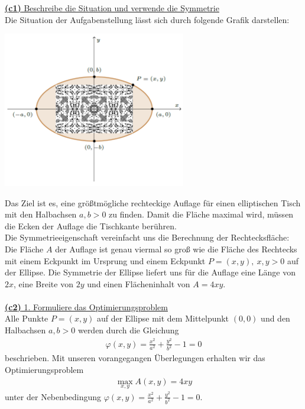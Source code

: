 \underline{\textbf{(c1)} Beschreibe die Situation und verwende die Symmetrie}\\
Die Situation der Aufgabenstellung lässt sich durch folgende Grafik darstellen:
\begin{center}
	\includegraphics[width=0.6\textwidth]{pictures/aufgabe1_c}
\end{center}
Das Ziel ist es, eine größtmögliche rechteckige Auflage für einen elliptischen Tisch mit den Halbachsen $ a,b > 0  $ zu finden. Damit die Fläche maximal wird, müssen die Ecken der Auflage die Tischkante berühren.\\
Die Symmetrieeigenschaft vereinfacht uns die Berechnung der Rechtecksfläche:\\
Die Fläche $ A $ der Auflage ist genau viermal so groß wie die Fläche des Rechtecks mit einem Eckpunkt im Ursprung und einem Eckpunkt $ P = (x,y), \ x,y > 0  $ auf der Ellipse. Die Symmetrie der Ellipse liefert uns für die Auflage eine Länge von $ 2x $, eine Breite von $ 2y $ und einen Flächeninhalt von $ A = 4 xy $.\\
\\
\newpage
\underline{\textbf{(c2)} 1. Formuliere das Optimierungsproblem}\\
Alle Punkte $ P=(x,y) $ auf der Ellipse mit dem Mittelpunkt $ (0,0) $ und den Halbachsen $ a,b > 0 $ werden durch die Gleichung
\begin{align*}
	\varphi(x,y) = \frac{x^2}{a^2} + \frac{y^2}{b^2} - 1 = 0
\end{align*} 
beschrieben.
Mit unseren vorangegangen Überlegungen erhalten wir das Optimierungsproblem
\begin{align*}
	\max \limits_{x,y} A(x,y) = 4 xy
\end{align*}
unter der Nebenbedingung $ \varphi(x,y) = \frac{x^2}{a^2} + \frac{y^2}{b^2} - 1 = 0 $.\\
\\
